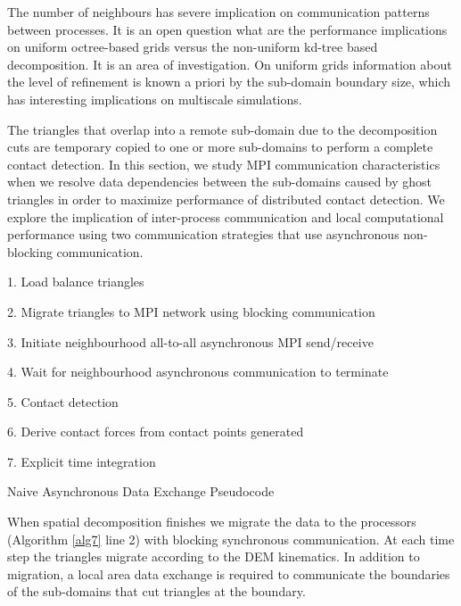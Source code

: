 \documentclass[times,12pt]{article}
\begin{document}
The number of neighbours has severe implication on communication patterns between processes. It is an open question what are the performance implications on uniform octree-based grids versus the non-uniform kd-tree based decomposition. It is an area of investigation. On uniform grids information about the level of refinement is known a priori by the sub-domain boundary size, which has interesting implications on multiscale simulations. 

The triangles that overlap into a remote sub-domain due to the decomposition cuts are temporary copied to one or more sub-domains to perform a complete contact detection. In this section, we study MPI communication characteristics when we resolve data dependencies between the sub-domains caused by ghost triangles in order to maximize performance of distributed contact detection. We explore the implication of inter-process communication and local computational performance using two communication strategies that use asynchronous non-blocking communication.

\begin{algorithm}
1. Load balance triangles

2. Migrate triangles to MPI network using blocking communication

3. Initiate neighbourhood all-to-all asynchronous MPI send/receive

4. Wait for neighbourhood asynchronous communication to terminate

5. Contact detection 

6. Derive contact forces from contact points generated

7. Explicit time integration

\protect\caption{\label{alg7}Naive Asynchronous Data Exchange Pseudocode}
\end{algorithm}


When spatial decomposition finishes we migrate the data to the processors (Algorithm \ref{alg7} line 2) with blocking synchronous communication. At each time step the triangles migrate according to the DEM kinematics. In addition to migration, a local area data exchange is required to communicate the boundaries of the sub-domains that cut triangles at the boundary. 
\end{document}
